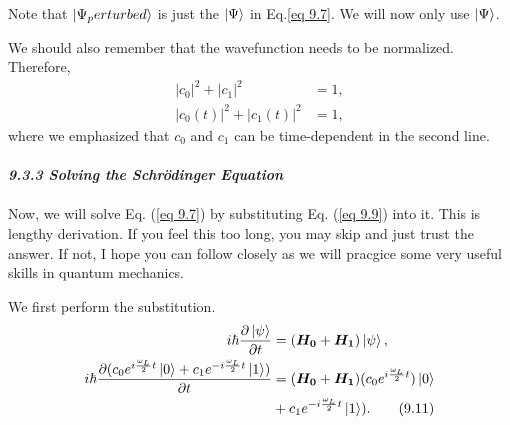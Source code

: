 \documentclass{article}
\newcommand{\bfit}[1]{\textit{\textbf{#1}}}
\begin{document}
Note that $\ket{\Psi_perturbed}$ is just the $\ket{\Psi}$ in Eq.{\ref{eq 9.7}}. We will now only
use $\ket{\Psi}$. 

We should also remember that the wavefunction needs to be normalized.
Therefore,
\begin{align*}\label{eq 9.10}
    |c_0|^2+|c_1|^2&=1,\\
    |c_0(t)|^2+|c_1(t)|^2&=1,\tag{9.10}
\end{align*}
where we emphasized that $c_0$ and $c_1$ can be time-dependent in the second line.
\\\\
\bfit{\large 9.3.3 Solving the Schr\"{o}dinger Equation}\\\\
Now, we will solve Eq. (\ref{eq 9.7}) by substituting Eq. (\ref{eq 9.9}) into it.
This is lengthy derivation. If you feel this too long, you may skip and just trust the answer.
If not, I  hope you can follow closely as we will pracgice some very useful skills
in quantum mechanics.

We first perform the substitution.
\begin{align*}\label{eq 9.11}
    i\hbar\frac{\partial\ket{\psi}}{\partial t}&=(\boldsymbol{H_0}+\boldsymbol{H_1})\ket{\psi},\\
    i\hbar\frac{\partial(c_0e^{i\frac{\omega_L}{2}t}\ket{0}+c_1e^{-i\frac{\omega_L}{2}t}\ket{1})}{\partial t}
    &=(\boldsymbol{H_0}+\boldsymbol{H_1})(c_0e^{i\frac{\omega_L}{2}t})\ket{0}\\
    &+c_1e^{-i\frac{\omega_L}{2}t}\ket{1}).\tag{9.11}
\end{align*}
\end{document}
